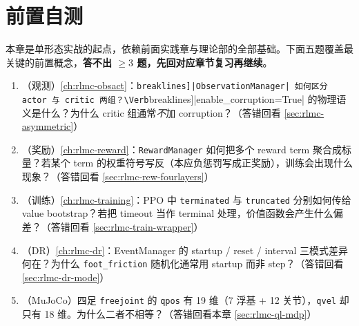 
\section{前置自测}
\label{sec:rlmc-ql-pretest}

本章是单形态实战的起点，依赖前面实践章与理论部的全部基础。下面五题覆盖最关键的前置概念，\textbf{答不出 $\ge 3$ 题，先回对应章节复习再继续}。

\begin{practice}[开课前自测]
\begin{enumerate}
\item （观测）\cref{ch:rlmc-obsact}：\Verb[breaklines]|ObservationManager| 如何区分 actor 与 critic 两组？\Verb[breaklines]|enable_corruption=True| 的物理语义是什么？为什么 critic 组通常\emph{不}加 corruption？（答错回看 \cref{sec:rlmc-asymmetric}）
\item （奖励）\cref{ch:rlmc-reward}：\verb|RewardManager| 如何把多个 reward term 聚合成标量？若某个 term 的权重符号写反（本应负惩罚写成正奖励），训练会出现什么现象？（答错回看 \cref{sec:rlmc-rew-fourlayers}）
\item （训练）\cref{ch:rlmc-training}：PPO 中 \verb|terminated| 与 \verb|truncated| 分别如何传给 value bootstrap？若把 timeout 当作 terminal 处理，价值函数会产生什么偏差？（答错回看 \cref{sec:rlmc-train-wrapper}）
\item （DR）\cref{ch:rlmc-dr}：EventManager 的 startup / reset / interval 三模式差异何在？为什么 \verb|foot_friction| 随机化通常用 startup 而非 step？（答错回看 \cref{sec:rlmc-dr-mode}）
\item （MuJoCo）四足 \verb|freejoint| 的 \verb|qpos| 有 19 维（7 浮基 + 12 关节），\verb|qvel| 却只有 18 维。为什么二者不相等？（答错回看本章 \cref{sec:rlmc-ql-mdp}）
\end{enumerate}
\end{practice}

